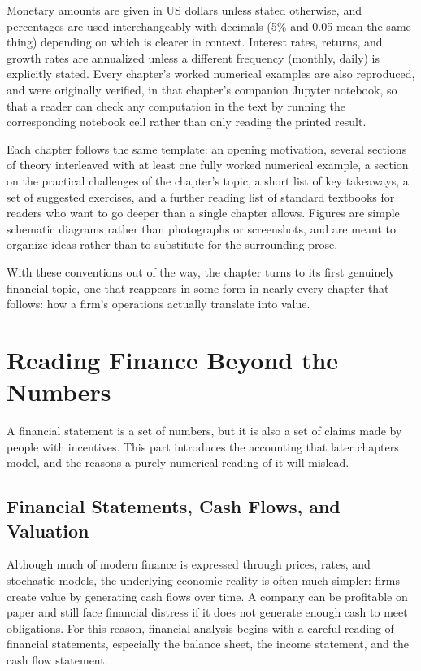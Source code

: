 \documentclass[../ai_in_finance]{subfiles}
\begin{document}
Monetary amounts are given in US dollars unless stated otherwise, and percentages are used interchangeably with decimals (5\% and 0.05 mean the same thing) depending on which is clearer in context. Interest rates, returns, and growth rates are annualized unless a different frequency (monthly, daily) is explicitly stated. Every chapter's worked numerical examples are also reproduced, and were originally verified, in that chapter's companion Jupyter notebook, so that a reader can check any computation in the text by running the corresponding notebook cell rather than only reading the printed result.

Each chapter follows the same template: an opening motivation, several sections of theory interleaved with at least one fully worked numerical example, a section on the practical challenges of the chapter's topic, a short list of key takeaways, a set of suggested exercises, and a further reading list of standard textbooks for readers who want to go deeper than a single chapter allows. Figures are simple schematic diagrams rather than photographs or screenshots, and are meant to organize ideas rather than to substitute for the surrounding prose.

With these conventions out of the way, the chapter turns to its first genuinely financial topic, one that reappears in some form in nearly every chapter that follows: how a firm's operations actually translate into value.

\section{Reading Finance Beyond the Numbers}

A financial statement is a set of numbers, but it is also a set of claims made by people with incentives. This part introduces the accounting that later chapters model, and the reasons a purely numerical reading of it will mislead.

\subsection{Financial Statements, Cash Flows, and Valuation}

Although much of modern finance is expressed through prices, rates, and stochastic models, the underlying economic reality is often much simpler: firms create value by generating cash flows over time. A company can be profitable on paper and still face financial distress if it does not generate enough cash to meet obligations. For this reason, financial analysis begins with a careful reading of financial statements, especially the balance sheet, the income statement, and the cash flow statement.
\end{document}
